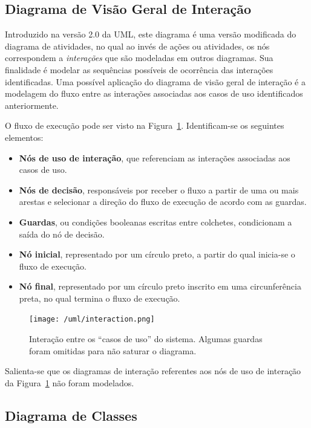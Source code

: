 \documentclass[
  10.5pt,				  %
	openright,			%
	twoside,			  %
  a5paper,
  chapter=TITLE,	%
	section=TITLE,	%
  hyphens,        %
	english,        %
	brazil          %
]{abntex2}
\begin{document}
\subsection{Diagrama de Visão Geral de Interação}

Introduzido na versão 2.0 da UML, este diagrama é uma versão modificada do diagrama de atividades, no qual ao invés de ações ou atividades, os nós correspondem a \emph{interações} que são modeladas em outros diagramas. Sua finalidade é modelar as sequências possíveis de ocorrência das interações identificadas. Uma possível aplicação do diagrama de visão geral de interação é a modelagem do fluxo entre as interações associadas aos casos de uso identificados anteriormente. 

O fluxo de execução pode ser visto na Figura~\ref{fig:interaction}. Identificam-se os seguintes elementos:

\begin{itemize}
  \item \textbf{Nós de uso de interação}, que referenciam as interações associadas aos casos de uso.
  \item \textbf{Nós de decisão}, responsáveis por receber o fluxo a partir de uma ou mais arestas e selecionar a direção do fluxo de execução de acordo com as guardas.
  \item \textbf{Guardas}, ou condições booleanas escritas entre colchetes, condicionam a saída do nó de decisão.
  \item \textbf{Nó inicial}, representado por um círculo preto, a partir do qual inicia-se o fluxo de execução.
  \item \textbf{Nó final}, representado por um círculo preto inscrito em uma circunferência preta, no qual termina o fluxo de execução. 
\end{itemize}

\begin{figure}[!ht]
  \caption{\label{fig:interaction} Interação entre os ``casos de uso'' do sistema. Algumas guardas foram omitidas para não saturar o diagrama.}
  \begin{center}
    \texttt{[image: /uml/interaction.png]}
  \end{center}
\end{figure}

Salienta-se que os diagramas de interação referentes aos nós de uso de interação da Figura~\ref{fig:interaction} não foram modelados.

\subsection{Diagrama de Classes}
\end{document}
